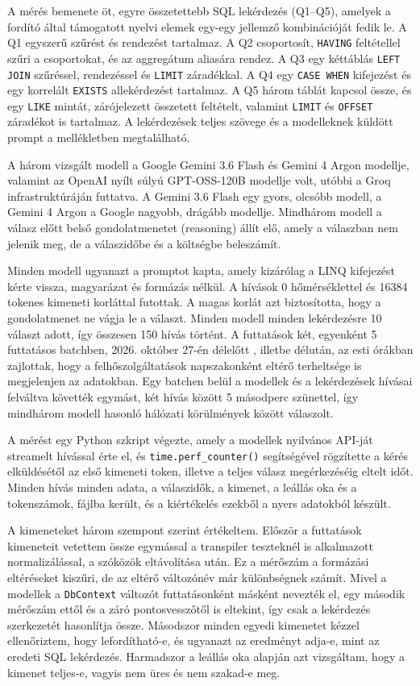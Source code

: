 \documentclass[a4paper,12pt]{article}
\begin{document}
A mérés bemenete öt, egyre összetettebb SQL lekérdezés (Q1--Q5), amelyek a fordító által támogatott nyelvi elemek egy-egy jellemző kombinációját fedik le. A Q1 egyszerű szűrést és rendezést tartalmaz. A Q2 csoportosít, \texttt{HAVING} feltétellel szűri a csoportokat, és az aggregátum aliasára rendez. A Q3 egy kéttáblás \texttt{LEFT JOIN} szűréssel, rendezéssel és \texttt{LIMIT} záradékkal. A Q4 egy \texttt{CASE WHEN} kifejezést és egy korrelált \texttt{EXISTS} allekérdezést tartalmaz. A Q5 három táblát kapcsol össze, és egy \texttt{LIKE} mintát, zárójelezett összetett feltételt, valamint \texttt{LIMIT} és \texttt{OFFSET} záradékot is tartalmaz. A lekérdezések teljes szövege és a modelleknek küldött prompt a mellékletben megtalálható.

A három vizsgált modell a Google Gemini 3.6 Flash és Gemini 4 Argon modellje, valamint az OpenAI nyílt súlyú GPT-OSS-120B modellje volt, utóbbi a Groq infrastruktúráján futtatva. A Gemini 3.6 Flash egy gyors, olcsóbb modell, a Gemini 4 Argon a Google nagyobb, drágább modellje. Mindhárom modell a válasz előtt belső gondolatmenetet (reasoning) állít elő, amely a válaszban nem jelenik meg, de a válaszidőbe és a költségbe beleszámít.

Minden modell ugyanazt a promptot kapta, amely kizárólag a LINQ kifejezést kérte vissza, magyarázat és formázás nélkül. A hívások 0 hőmérséklettel és 16384 tokenes kimeneti korláttal futottak. A magas korlát azt biztosította, hogy a gondolatmenet ne vágja le a választ. Minden modell minden lekérdezésre 10 választ adott, így összesen 150 hívás történt. A futtatások két, egyenként 5 futtatásos batchben, 2026. október 27-én délelőtt , illetbe délután, az esti órákban zajlottak, hogy a felhőszolgáltatások napszakonként eltérő terheltsége is megjelenjen az adatokban. Egy batchen belül a modellek és a lekérdezések hívásai felváltva követték egymást, két hívás között 5 másodperc szünettel, így mindhárom modell hasonló hálózati körülmények között válaszolt.

A mérést egy Python szkript végezte, amely a modellek nyilvános API-ját streamelt hívással érte el, és \texttt{time.perf\_counter()} segítségével rögzítette a kérés elküldésétől az első kimeneti token, illetve a teljes válasz megérkezéséig eltelt időt.    Minden hívás minden adata, a válaszidők, a kimenet, a leállás oka és a tokenszámok, fájlba került, és a kiértékelés ezekből a nyers adatokból készült.

A kimeneteket három szempont szerint értékeltem. Először a futtatások kimeneteit vetettem össze egymással a transpiler teszteknél is alkalmazott normalizálással, a szóközök eltávolítása után. Ez a mérőszám a formázási eltéréseket kiszűri, de az eltérő változónév már különbségnek számít. Mivel a modellek a \texttt{DbContext} változót futtatásonként másként nevezték el, egy második mérőszám ettől és a záró pontosvesszőtől is eltekint, így csak a lekérdezés szerkezetét hasonlítja össze. Másodszor minden egyedi kimenetet kézzel ellenőriztem, hogy lefordítható-e, és ugyanazt az eredményt adja-e, mint az eredeti SQL lekérdezés. Harmadszor a leállás oka alapján azt vizsgáltam, hogy a kimenet teljes-e, vagyis nem üres és nem szakad-e meg.
\end{document}

